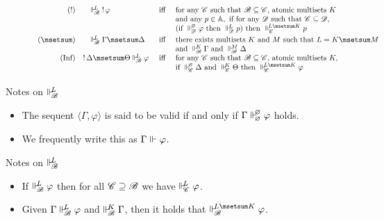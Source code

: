 \documentclass{beamer}
\begin{document}
\begin{frame}
\begin{minipage}{0.47\textwidth}
\begin{figure}[t]
\[\begin{array}{r@{\qquad}l@{\quad}c@{\quad}l}
					(\bang) & \suppM{\baseB}{L} \bang \varphi & \text{iff} &  \text{for any } \baseC  \text{ such that } \baseB \baseLeq \baseC \text{, atomic multisets } K \\ 
					& & & \text{and any } p \in \At, \text{ if for any } \baseD \text{ such that } \baseC\baseLeq\baseD, \\
					& & & (\text{if } \suppM{\baseD}{\emptymultiset}\varphi \text{ then } \suppM{\baseD}{L}p) \text{ then } \suppM{\baseC}{L\msetsum K}p  \\[1mm]
					(\msetsum) & \suppM{\baseB}{L}\Gamma\msetsum\Delta & \text{iff} & \text{there exists multisets } K \text{ and } M \text{ such that } L=K\msetsum M \\ 
					& & &\text{and } \suppM{\baseB}{K}\Gamma \text{ and } \suppM{\baseB}{M}\Delta \\
					\mbox{(Inf)} & \hspace{-1em} \bang\Delta\msetsum\Theta \suppM{\baseB}{L} \varphi & \text{ iff } & \text{for any } \baseC \text{ such that } \baseB \baseLeq \baseC \text{, atomic multisets } K, \\
					& & & \text{if }   \suppM{\baseC}{\emptymultiset} \Delta \text{ and } \suppM{\baseC}{K} \Theta \text{ then } \suppM{\baseC}{L\msetsum K} \varphi \\[1mm]
				\end{array}
				\]
	\end{figure}
	\end{minipage}
\end{frame}
\begin{frame}{Notes on $\Vdash_{ \!\!\mathscr{B} }^{ \!\!L }$}
	\begin{itemize}
	\item The sequent $\langle\Gamma,\varphi\rangle$ is said to be valid if and only if $\Gamma\Vdash_{ \!\!\varnothing }^{ \!\!\varnothing }\varphi$ holds.
	\vspace{5pt}
	\item We frequently write this as $\Gamma \Vdash_{ \!\! }^{ \!\! }\varphi$.
	\end{itemize}
\end{frame}
\begin{frame}{Notes on $\Vdash_{ \!\!\mathscr{B} }^{ \!\!L }$}
	\begin{itemize}
	\item If $\Vdash_{ \!\!\mathscr{B} }^{ \!\!L }\varphi$ then for all $\mathscr{C} \supseteq \mathscr{B}$ we have $\Vdash_{ \!\!\mathscr{C} }^{ \!\!L }\varphi$.
	\vspace{5pt}
	\item Given $\Gamma\Vdash_{ \!\!\mathscr{B} }^{ \!\!L }\varphi$ and $\Vdash_{ \!\!\mathscr{B} }^{ \!\!K }\Gamma$, then it holds that $\suppM{\baseB}{L\msetsum K}\varphi$.
	\end{itemize}
\end{frame}
\end{document}
